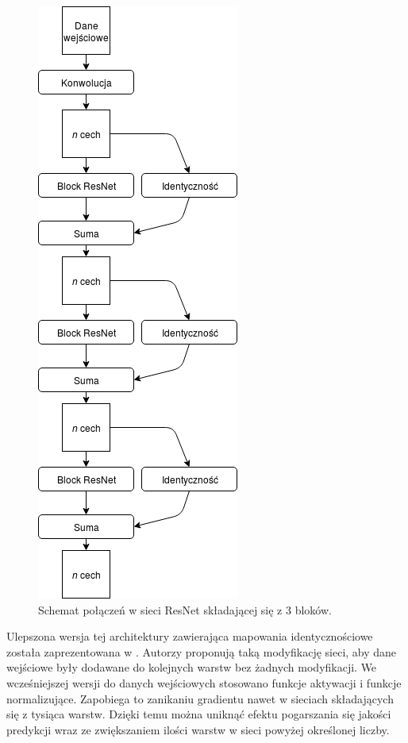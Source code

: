 \documentclass[a4paper,11pt,twoside]{report}
\theoremstyle{definition}
\begin{document}
\begin{figure}[h!]
	\centering
	\includegraphics[scale=0.5]{resnet}
	\caption{Schemat połączeń w sieci ResNet składającej się z 3 bloków.}
\end{figure}

Ulepszona wersja tej architektury zawierająca mapowania identycznościowe została zaprezentowana w \cite{preResnet}. Autorzy proponują taką modyfikację sieci, aby dane wejściowe były dodawane do kolejnych warstw bez żadnych modyfikacji. We wcześniejszej wersji do danych wejściowych stosowano funkcje aktywacji i funkcje normalizujące. Zapobiega to zanikaniu gradientu nawet w sieciach składających się z tysiąca warstw. Dzięki temu można uniknąć efektu pogarszania się jakości predykcji wraz ze zwiększaniem ilości warstw w sieci powyżej określonej liczby.
\end{document}
